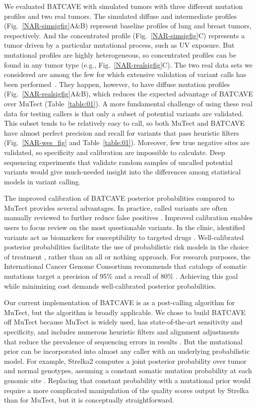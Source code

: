 \documentclass[a4,center,fleqn]{NAR}
\newcommand{\batcave}{BATCAVE\xspace}
\begin{document}
We evaluated \batcave with simulated tumors with three different mutation profiles and two real tumors.
The simulated diffuse and intermediate profiles (Fig.~\ref{NAR-simsigfig}A\&B) represent baseline profiles of lung and breast tumors, respectively.
And the concentrated profile (Fig.~\ref{NAR-simsigfig}C) represents a tumor driven by a particular mutational process, such as UV exposure.
But mutational profiles are highly heterogeneous, so concentrated profiles can be found in any tumor type (e.g., Fig.~\ref{NAR-realsigfig}C).
The two real data sets we considered are among the few for which extensive validation of variant calls has been performed~\cite{Griffith2015, Shi2018}.
They happen, however, to have diffuse mutation profiles (Fig.~\ref{NAR-realsigfig}A\&B), which reduces the expected advantage of \batcave over MuTect (Table~\ref{table:01}).
A more fundamental challenge of using these real data for testing callers is that only a subset of potential variants are validated.
This subset tends to be relatively easy to call, so both MuTect and \batcave have almost perfect precision and recall for variants that pass heuristic filters (Fig.~\ref{NAR-wes_fig} and Table~\ref{table:01}).
Moreover, few true negative sites are validated, so specificity and calibration are impossible to calculate.
Deep sequencing experiments that validate random samples of uncalled potential variants would give much-needed insight into the differences among statistical models in variant calling.

The improved calibration of \batcave posterior probabilities compared to MuTect provides several advantages.
In practice, called variants are often manually reviewed to further reduce false positives \cite{Barnell2019}.
Improved calibration enables users to focus review on the most questionable variants.
In the clinic, identified variants act as biomarkers for susceptibility to targeted drugs \cite{Boutros2015a}.
Well-calibrated posterior probabilities facilitate the use of probabilistic risk models in the choice of treatment \cite{Holmberg2013}, rather than an all or nothing approach.
For research purposes, the International Cancer Genome Consortium recommends that catalogs of somatic mutations target a precision of 95\% and a recall of 80\% \cite{Icgc}.
Achieving this goal while minimizing cost demands well-calibrated posterior probabilities.

Our current implementation of \batcave is as a post-calling algorithm for MuTect, but the algorithm is broadly applicable.
We chose to build \batcave off MuTect because MuTect is widely used, has state-of-the-art sensitivity and specificity, and includes numerous heuristic filters and alignment adjustments that reduce the prevalence of sequencing errors in results \cite{Cibulskis2013,Griffith2015}.
But the mutational prior can be incorporated into almost any caller with an underlying probabilistic model.
For example, Strelka2 computes a joint posterior probability over tumor and normal genotypes, assuming a constant somatic mutation probability at each genomic site \cite{Kim2018}.
Replacing that constant probability with a mutational prior would require a more complicated manipulation of the quality scores output by Strelka than for MuTect, but it is conceptually straightforward.
\end{document}
